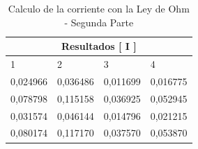 \documentclass[letterpaper, 12pt]{report}
\begin{document}
\begin{table}[H]
	\begin{center}
		\begin{tabular}{| p{2cm} | p{2cm} | p{2cm} | p{2cm} |}
			\hline
			\multicolumn{4}{c}{Resultados [ I ]}      \\ \hline


			1        & 2        & 3        & 4        \\ \hline

			0,024966 & 0,036486 & 0,011699 & 0,016775 \\ \hline

			0,078798 & 0,115158 & 0,036925 & 0,052945 \\ \hline

			0,031574 & 0,046144 & 0,014796 & 0,021215 \\ \hline

			0,080174 & 0,117170 & 0,037570 & 0,053870 \\ \hline
		\end{tabular}
		\caption{Calculo de la corriente con la Ley de Ohm - Segunda Parte}
		\label{tab:LeyDeOhmSegundaParte}
	\end{center}
\end{table}
\end{document}
